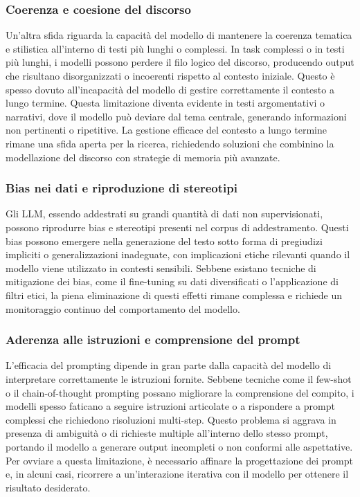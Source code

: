 \documentclass[target=mst,aauheader=,style=]{thud}
\begin{document}
\subsubsection{Coerenza e coesione del discorso}
Un’altra sfida riguarda la capacità del modello di mantenere la coerenza tematica e stilistica all'interno di testi più lunghi o complessi. In task complessi o in testi più lunghi, i modelli possono perdere il filo logico del discorso, producendo output che risultano disorganizzati o incoerenti rispetto al contesto iniziale. Questo è spesso dovuto all’incapacità del modello di gestire correttamente il contesto a lungo termine. Questa limitazione diventa evidente in testi argomentativi o narrativi, dove il modello può deviare dal tema centrale, generando informazioni non pertinenti o ripetitive. La gestione efficace del contesto a lungo termine rimane una sfida aperta per la ricerca, richiedendo soluzioni che combinino la modellazione del discorso con strategie di memoria più avanzate.\cite{naveed_2024}

\subsubsection{Bias nei dati e riproduzione di stereotipi}
Gli LLM, essendo addestrati su grandi quantità di dati non supervisionati, possono riprodurre bias e stereotipi presenti nel corpus di addestramento. Questi bias possono emergere nella generazione del testo sotto forma di pregiudizi impliciti o generalizzazioni inadeguate, con implicazioni etiche rilevanti quando il modello viene utilizzato in contesti sensibili. Sebbene esistano tecniche di mitigazione dei bias, come il fine-tuning su dati diversificati o l’applicazione di filtri etici, la piena eliminazione di questi effetti rimane complessa e richiede un monitoraggio continuo del comportamento del modello.\cite{hadi_2024}

\subsubsection{Aderenza alle istruzioni e comprensione del prompt}
L’efficacia del prompting dipende in gran parte dalla capacità del modello di interpretare correttamente le istruzioni fornite. Sebbene tecniche come il few-shot o il chain-of-thought prompting possano migliorare la comprensione del compito, i modelli spesso faticano a seguire istruzioni articolate o a rispondere a prompt complessi che richiedono risoluzioni multi-step. Questo problema si aggrava in presenza di ambiguità o di richieste multiple all'interno dello stesso prompt, portando il modello a generare output incompleti o non conformi alle aspettative. Per ovviare a questa limitazione, è necessario affinare la progettazione dei prompt e, in alcuni casi, ricorrere a un’interazione iterativa con il modello per ottenere il risultato desiderato.\cite{sahoo_2024}
\end{document}
